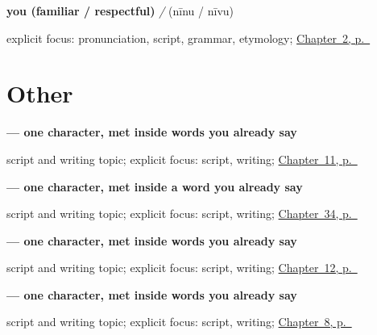 \noindent\begin{minipage}[t]{\linewidth}
\raggedright
\textbf{you (familiar / respectful)}\enspace\emph{ / }\enspace(nīnu / nīvu)\par
\footnotesize explicit focus: pronunciation, script, grammar, etymology; \hyperref[ch:introductions]{Chapter~2, p.~\pageref*{ch:introductions}}
\end{minipage}\par\smallskip

\section*{Other}

\noindent\begin{minipage}[t]{\linewidth}
\raggedright
\textbf{ — one character, met inside words you already say}\par
\footnotesize script and writing topic; explicit focus: script, writing; \hyperref[ch:ka-core-colours]{Chapter~11, p.~\pageref*{ch:ka-core-colours}}
\end{minipage}\par\smallskip

\noindent\begin{minipage}[t]{\linewidth}
\raggedright
\textbf{ — one character, met inside a word you already say}\par
\footnotesize script and writing topic; explicit focus: script, writing; \hyperref[ch:ka-social-verbs]{Chapter~34, p.~\pageref*{ch:ka-social-verbs}}
\end{minipage}\par\smallskip

\noindent\begin{minipage}[t]{\linewidth}
\raggedright
\textbf{ — one character, met inside words you already say}\par
\footnotesize script and writing topic; explicit focus: script, writing; \hyperref[ch:ka-family]{Chapter~12, p.~\pageref*{ch:ka-family}}
\end{minipage}\par\smallskip

\noindent\begin{minipage}[t]{\linewidth}
\raggedright
\textbf{ — one character, met inside words you already say}\par
\footnotesize script and writing topic; explicit focus: script, writing; \hyperref[ch:ka-please]{Chapter~8, p.~\pageref*{ch:ka-please}}
\end{minipage}\par\smallskip

